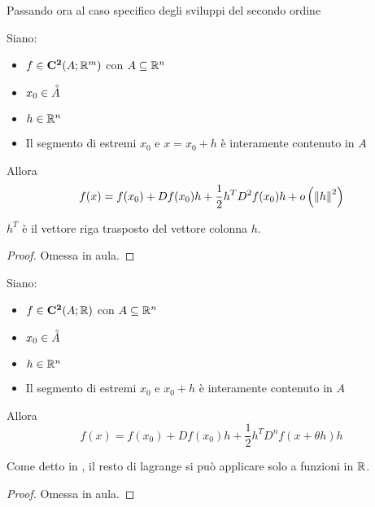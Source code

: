 \noindent Passando ora al caso specifico degli sviluppi del secondo ordine
\begin{proposition}
	\label{prop:svil_tay_2_peano}
	Siano:
	\begin{itemize}[noitemsep]
		\item $f \in \mathbf{C^{2}}(A;\mathbb{R}^m)$ con $A \subseteq \mathbb{R}^n$
		\item $x_0 \in \accentset{\circ}{A}$
		\item $h \in \mathbb{R}^n$
		\item Il segmento di estremi $x_0$ e $x = x_0 + h$ è interamente contenuto in $A$
	\end{itemize}
	Allora
	\[f(x) = f(x_0) + Df(x_0)h + \frac{1}{2} h^T D^2f(x_0) h + o\left( \left\|h\right\|^2 \right)\]
	\begin{note}
		$h^T$ è il vettore riga trasposto del vettore colonna $h$.
	\end{note}
	\begin{proof}
		Omessa in aula.
	\end{proof}
\end{proposition}

\begin{proposition}
	Siano:
	\begin{itemize}[noitemsep]
		\item $f \in \mathbf{C^{2}}(A;\mathbb{R})$ con $A \subseteq \mathbb{R}^n$
		\item $x_0 \in \accentset{\circ}{A}$
		\item $h \in \mathbb{R}^n$
		\item Il segmento di estremi $x_0$ e $x_0 + h$ è interamente contenuto in $A$
	\end{itemize}
	Allora
	\[f(x) = f(x_0) + Df(x_0)h + \frac{1}{2} h^T D^n f(x + \theta h) h\] %
	\begin{note}
		Come detto in , il resto di lagrange si può applicare solo a funzioni in $\mathbb{R}$.
	\end{note}
	\begin{proof}
		Omessa in aula.
	\end{proof}
\end{proposition}

